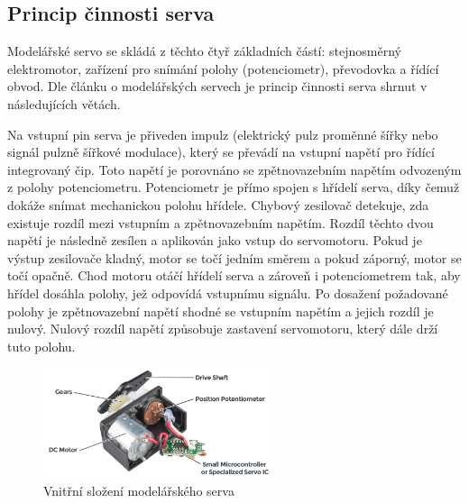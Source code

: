 \subsection*{Princip činnosti serva}
Modelářské servo se skládá z těchto čtyř základních částí: stejnosměrný elektromotor, zařízení pro snímání polohy (potenciometr), převodovka a řídící obvod. Dle článku o modelářských servech \cite{HobbyServos} je princip činnosti serva shrnut v následujících větách.

Na vstupní pin serva je přiveden impulz (elektrický pulz proměnné šířky nebo signál pulzně šířkové modulace), který se převádí na vstupní napětí pro řídící integrovaný čip. Toto napětí je porovnáno se zpětnovazebním napětím odvozeným z polohy potenciometru. Potenciometr je přímo spojen s hřídelí serva, díky čemuž dokáže snímat mechanickou polohu hřídele. Chybový zesilovač detekuje, zda existuje rozdíl mezi vstupním a zpětnovazebním napětím. Rozdíl těchto dvou napětí je následně zesílen a aplikován jako vstup do servomotoru. Pokud je výstup zesilovače kladný, motor se točí jedním směrem a pokud záporný, motor se točí opačně. Chod motoru otáčí hřídelí serva a zároveň i potenciometrem tak, aby hřídel dosáhla polohy, jež odpovídá vstupnímu signálu. Po dosažení požadované polohy je zpětnovazební napětí shodné se vstupním napětím a jejich rozdíl je nulový. Nulový rozdíl napětí způsobuje zastavení servomotoru, který dále drží tuto polohu.

\begin{figure}[hbt]
	\centering
	\includegraphics[width=0.6\textwidth]{obrazky-figures/servo-parts-labeled.jpg}
	\caption[servoInternal]{Vnitřní složení modelářského serva\footnotemark}
	\label{servo_internal}
\end{figure}

